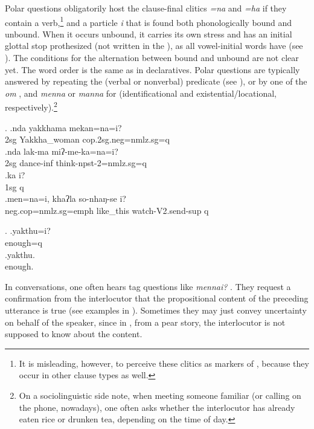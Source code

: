  Polar questions obligatorily host the clause-final clitics \emph{=na} and \emph{=ha} if they contain a verb,\footnote{It is misleading, however, to perceive these clitics as markers of , because they occur in other clause types as well.} and  a particle \emph{i}  that is found both phonologically bound and unbound. When it occurs unbound, it carries its own stress and has an initial glottal stop prothesized (not written in the ), as all  vowel-initial words have (see \Next). The conditions for the alternation between bound and unbound are not clear yet. The word order is the same as in declaratives. Polar questions are typically answered by repeating the (verbal or nonverbal)  predicate (see \NNext), or by one of the  \emph{om} , and \emph{menna} or \emph{manna} for  (identificational and existential/locational, respectively).\footnote{On a sociolinguistic side note, when meeting someone familiar (or calling on the phone, nowadays), one often asks whether the interlocutor has already eaten rice or drunken tea, depending on the time of day.} 
 
 \ex. \ag.nda yakkhama              mekan=na=i? \\
 {\sc 2sg} Yakkha\_woman {\sc cop.2sg.neg=nmlz.sg=q}\\
  
 \bg.nda lak-ma miʔ-me-ka=na=i?\\
 {\sc 2sg} dance{\sc -inf} think{\sc -npst-2=nmlz.sg=q}\\
 \bg.ka i?\\
 {\sc 1sg} {\sc q}\\
 \bg.men=na=i,                khaʔla   so-nhaŋ-se               i?\\
 {\sc neg.cop=nmlz.sg=emph} like\_this watch{\sc -V2.send-sup} {\sc q}\\
  
 
 \ex. \ag.yakthu=i?\\
 enough{\sc =q}\\
 \bg.yakthu.\\
 enough.\\
 


In conversations, one often hears tag questions like \emph{mennai?} . They request a confirmation from the interlocutor that the propositional content of the preceding utterance is true (see examples in \Next). Sometimes they may just convey uncertainty on behalf of the speaker, since in \Next[c], from a pear story, the interlocutor is not supposed to know about the content. 
 
